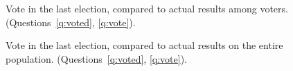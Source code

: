\begin{figure}[h!]
    \caption[Vote in the last election compared to actual results (among voters)]{Vote in the last election, compared to actual results among voters. (Questions~\ref{q:voted}, \ref{q:vote}).
    }\label{fig:vote_pnr_out}
\end{figure}

\begin{figure}[h!]
    \caption[Vote in the last election compared to actual results (entire population)]{Vote in the last election, compared to actual results on the entire population. (Questions~\ref{q:voted}, \ref{q:vote}).
    }\label{fig:vote_representativeness}
\end{figure}

